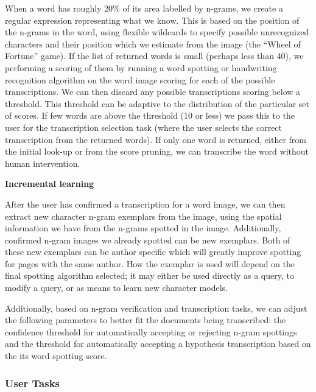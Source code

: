 \documentclass[ms]{byuprop}
\begin{document}
{\begin{addmargin}[3em]{3em}
When a word has roughly 20\% of its area labelled by n-grams, we create a regular expression representing what we know. This is based on the position of the n-grams in the word, using flexible wildcards to specify possible unrecognized characters and their position which we estimate from the image (the ``Wheel of Fortune'' game). If the list of returned words is small (perhaps less than 40), we performing a scoring of them by running a word spotting or handwriting recognition algorithm on the word image scoring for each of the possible transcriptions. We can then discard any possible transcriptions scoring below a threshold. This threshold can be adaptive to the distribution of the particular set of scores. If few words are above the threshold (10 or less) we pass this to the user for the transcription selection task (where the user selects the correct transcription from the returned words). If only one word is returned, either from the initial look-up or from the score pruning, we can transcribe the word without human intervention.
\\[.5cm]
\end{addmargin}

\textbf{Incremental learning}

\begin{addmargin}[3em]{3em}
After the user has confirmed a transcription for a word image, we can then extract new character n-gram exemplars from the image, using the spatial information we have from the n-grams spotted in the image. Additionally, confirmed n-gram images we already spotted can be new exemplars. Both of these new exemplars can be author specific which will greatly improve spotting for pages with the same author. How the exemplar is used will depend on the final spotting algorithm selected; it may either be used directly as a query, to modify a query, or as means to learn new character models.


\-\hspace{1cm} Additionally, based on n-gram verification and transcription tasks, we can adjust the following parameters to better fit the documents being transcribed: the confidence threshold for automatically accepting or rejecting n-gram spottings and the threshold for automatically accepting a hypothesis transcription based on the its word spotting score.
\\[.5cm]
\end{addmargin}
}


\subsubsection{User Tasks}
\end{document}
